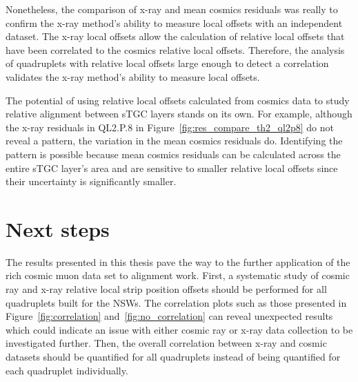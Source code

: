 Nonetheless, the comparison of x-ray and mean cosmics residuals was really to confirm the x-ray method's ability to measure local offsets with an independent dataset. The x-ray local offsets allow the calculation of relative local offsets that have been correlated to the cosmics relative local offsets. Therefore, the analysis of quadruplets with relative local offsets large enough to detect a correlation validates the x-ray method's ability to measure local offsets. 

The potential of using relative local offsets calculated from cosmics data to study relative alignment between sTGC layers stands on its own. For example, although the x-ray residuals in QL2.P.8 in Figure~\ref{fig:res_compare_th2_ql2p8} do not reveal a pattern, the variation in the mean cosmics residuals do. Identifying the pattern is possible because mean cosmics residuals can be calculated across the entire sTGC layer's area and are sensitive to smaller relative local offsets since their uncertainty is significantly smaller. 


\section{Next steps}

The results presented in this thesis pave the way to the further application of the rich cosmic muon data set to alignment work. First, a systematic study of cosmic ray and x-ray relative local strip position offsets should be performed for all quadruplets built for the NSWs. The correlation plots such as those presented in Figure~\ref{fig:correlation} and~\ref{fig:no_correlation} can reveal unexpected results which could indicate an issue with either cosmic ray or x-ray data collection to be investigated further. Then, the overall correlation between x-ray and cosmic datasets should be quantified for all quadruplets instead of being quantified for each quadruplet individually.
 
